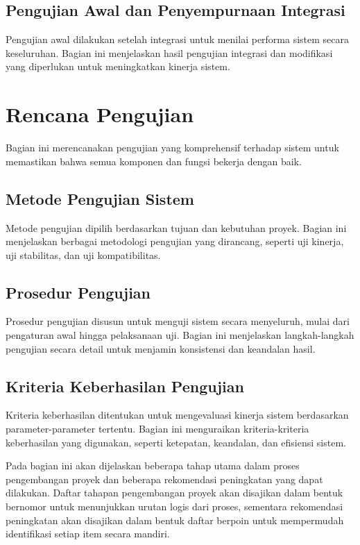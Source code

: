 \subsection{Pengujian Awal dan Penyempurnaan Integrasi}
Pengujian awal dilakukan setelah integrasi untuk menilai performa sistem secara keseluruhan. Bagian ini menjelaskan hasil pengujian integrasi dan modifikasi yang diperlukan untuk meningkatkan kinerja sistem.

\section{Rencana Pengujian}
Bagian ini merencanakan pengujian yang komprehensif terhadap sistem untuk memastikan bahwa semua komponen dan fungsi bekerja dengan baik.

\subsection{Metode Pengujian Sistem}
Metode pengujian dipilih berdasarkan tujuan dan kebutuhan proyek. Bagian ini menjelaskan berbagai metodologi pengujian yang dirancang, seperti uji kinerja, uji stabilitas, dan uji kompatibilitas.

\subsection{Prosedur Pengujian}
Prosedur pengujian disusun untuk menguji sistem secara menyeluruh, mulai dari pengaturan awal hingga pelaksanaan uji. Bagian ini menjelaskan langkah-langkah pengujian secara detail untuk menjamin konsistensi dan keandalan hasil.

\subsection{Kriteria Keberhasilan Pengujian}
Kriteria keberhasilan ditentukan untuk mengevaluasi kinerja sistem berdasarkan parameter-parameter tertentu. Bagian ini menguraikan kriteria-kriteria keberhasilan yang digunakan, seperti ketepatan, keandalan, dan efisiensi sistem.

Pada bagian ini akan dijelaskan beberapa tahap utama dalam proses pengembangan proyek dan beberapa rekomendasi peningkatan yang dapat dilakukan. Daftar tahapan pengembangan proyek akan disajikan dalam bentuk bernomor untuk menunjukkan urutan logis dari proses, sementara rekomendasi peningkatan akan disajikan dalam bentuk daftar berpoin untuk mempermudah identifikasi setiap item secara mandiri.